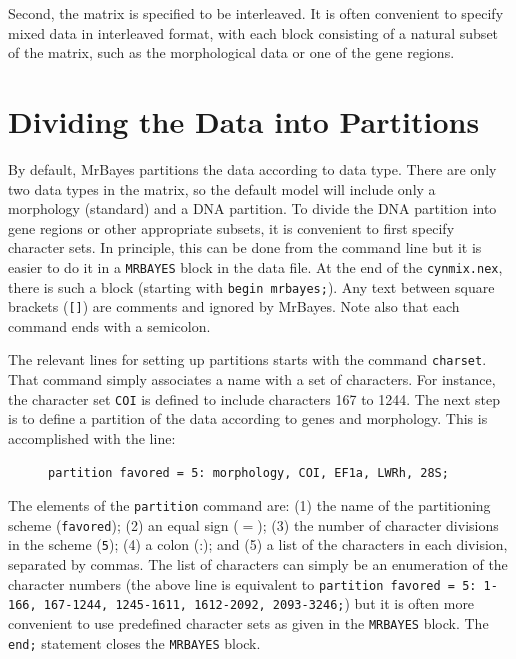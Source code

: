 \documentclass[12pt]{book}
\begin{document}
Second, the matrix is specified to be interleaved. It is often convenient to specify mixed data in
interleaved format, with each block consisting of a natural subset of the matrix, such as the
morphological data or one of the gene regions.

\section{Dividing the Data into Partitions}

By default, MrBayes partitions the data according to data type. There are only two data types in
the matrix, so the default model will include only a morphology (standard) and a DNA partition. To
divide the DNA partition into gene regions or other appropriate subsets, it is convenient to first
specify character sets. In principle, this can be done from the command line but it is easier to do
it in a \texttt{MRBAYES} block in the data file. At the end of the \texttt{cynmix.nex}, there is
such a block (starting with \texttt{begin mrbayes;}). Any text between square brackets
(\texttt{[]}) are comments and ignored by MrBayes. Note also that each command ends with a
semicolon.

The relevant lines for setting up partitions starts with the command \texttt{charset}. That command
simply associates a name with a set of characters. For instance, the character set \texttt{COI} is
defined to include characters 167 to 1244. The next step is to define a partition of the data
according to genes and morphology. This is accomplished with the line:

\begin{figure}[h]
\begin{BVerbatim}[fontsize=\small]
partition favored = 5: morphology, COI, EF1a, LWRh, 28S;
\end{BVerbatim}
\end{figure}

The elements of the \texttt{partition} command are: (1) the name of the partitioning scheme
(\texttt{favored}); (2) an equal sign ($=$); (3) the number of character divisions in the scheme
(\texttt{5}); (4) a colon (:); and (5) a list of the characters in each division, separated by
commas.  The list of characters can simply be an enumeration of the character numbers (the above
line is equivalent to \texttt{partition favored = 5: 1-166, 167-1244, 1245-1611, 1612-2092,
2093-3246;}) but it is often more convenient to use predefined character sets as given in the
\texttt{MRBAYES} block.  The \texttt{end;} statement closes the \texttt{MRBAYES} block.
\end{document}
